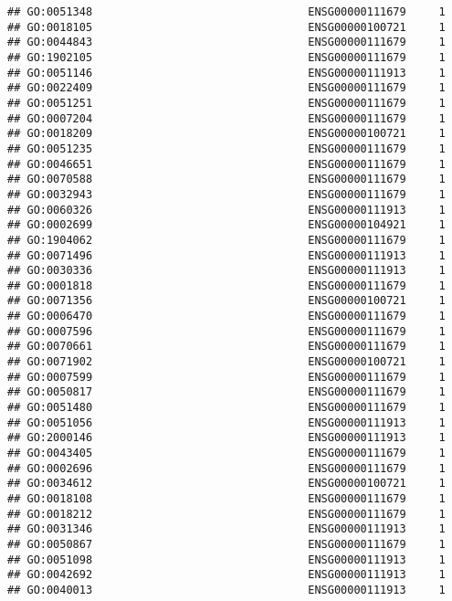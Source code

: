 \documentclass[
]{article}
\begin{document}
\begin{verbatim}
## GO:0051348                                 ENSG00000111679     1
## GO:0018105                                 ENSG00000100721     1
## GO:0044843                                 ENSG00000111679     1
## GO:1902105                                 ENSG00000111679     1
## GO:0051146                                 ENSG00000111913     1
## GO:0022409                                 ENSG00000111679     1
## GO:0051251                                 ENSG00000111679     1
## GO:0007204                                 ENSG00000111679     1
## GO:0018209                                 ENSG00000100721     1
## GO:0051235                                 ENSG00000111679     1
## GO:0046651                                 ENSG00000111679     1
## GO:0070588                                 ENSG00000111679     1
## GO:0032943                                 ENSG00000111679     1
## GO:0060326                                 ENSG00000111913     1
## GO:0002699                                 ENSG00000104921     1
## GO:1904062                                 ENSG00000111679     1
## GO:0071496                                 ENSG00000111913     1
## GO:0030336                                 ENSG00000111913     1
## GO:0001818                                 ENSG00000111679     1
## GO:0071356                                 ENSG00000100721     1
## GO:0006470                                 ENSG00000111679     1
## GO:0007596                                 ENSG00000111679     1
## GO:0070661                                 ENSG00000111679     1
## GO:0071902                                 ENSG00000100721     1
## GO:0007599                                 ENSG00000111679     1
## GO:0050817                                 ENSG00000111679     1
## GO:0051480                                 ENSG00000111679     1
## GO:0051056                                 ENSG00000111913     1
## GO:2000146                                 ENSG00000111913     1
## GO:0043405                                 ENSG00000111679     1
## GO:0002696                                 ENSG00000111679     1
## GO:0034612                                 ENSG00000100721     1
## GO:0018108                                 ENSG00000111679     1
## GO:0018212                                 ENSG00000111679     1
## GO:0031346                                 ENSG00000111913     1
## GO:0050867                                 ENSG00000111679     1
## GO:0051098                                 ENSG00000111913     1
## GO:0042692                                 ENSG00000111913     1
## GO:0040013                                 ENSG00000111913     1

\end{verbatim}
\end{document}
